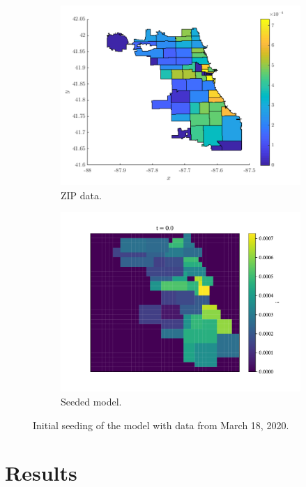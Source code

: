 \documentclass[11pt]{article}
\begin{document}
		\begin{figure}[h!]
			\centering
			\begin{subfigure}{0.5\textwidth}
				\includegraphics[width=\textwidth]{t0-cases}
				\caption{ZIP data.}
			\end{subfigure}%
			\begin{subfigure}{0.5\textwidth}
				\includegraphics[width=\textwidth]{infected_0}
				\caption{Seeded model.}
			\end{subfigure}
			\caption{Initial seeding of the model with data from March 18, 2020.}
			\label{fig:seeding}
		\end{figure}
	
\section{Results}
\end{document}
